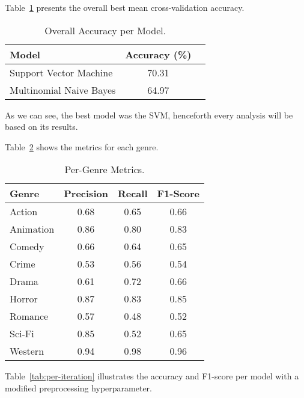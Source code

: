 \documentclass[3pt, sigconf, nonacm]{acmart}
\begin{document}

Table~\ref{tab:accuracy} presents the overall best mean cross-validation accuracy. 
\begin{table}[h]
\centering
\caption{\footnotesize Overall Accuracy per Model.}
\renewcommand{\arraystretch}{0.8} %
\begin{tabular}{lcc}
\toprule
\textbf{Model} & \textbf{Accuracy (\%)} \\
\midrule
Support Vector Machine & 70.31 \\
Multinomial Naive Bayes & 64.97 \\
\bottomrule
\end{tabular}
\label{tab:accuracy}
\end{table}


As we can see, the best model was the SVM, henceforth every analysis will be based on its results.

Table~\ref{tab:per-genre-metrics} shows the metrics for each genre.

\begin{table}[h]
\centering
\caption{\footnotesize Per-Genre Metrics.}
\label{tab:per-genre-metrics}
\renewcommand{\arraystretch}{1.0} %
\begin{tabular}{lccc}
\toprule
\textbf{Genre} & \textbf{Precision} & \textbf{Recall} & \textbf{F1-Score} \\
\midrule
Action & 0.68 & 0.65 & 0.66 \\
Animation & 0.86 & 0.80 & 0.83 \\
Comedy & 0.66 & 0.64 & 0.65 \\
Crime & 0.53 & 0.56 & 0.54 \\
Drama & 0.61 & 0.72 & 0.66 \\
Horror & 0.87 & 0.83 & 0.85 \\
Romance & 0.57 & 0.48 & 0.52 \\
Sci-Fi & 0.85 & 0.52 & 0.65 \\
Western & 0.94 & 0.98 & 0.96 \\
\bottomrule
\end{tabular}
\end{table}


Table~\ref{tab:per-iteration} illustrates the accuracy and F1-score per model with a modified preprocessing hyperparameter.
\end{document}
